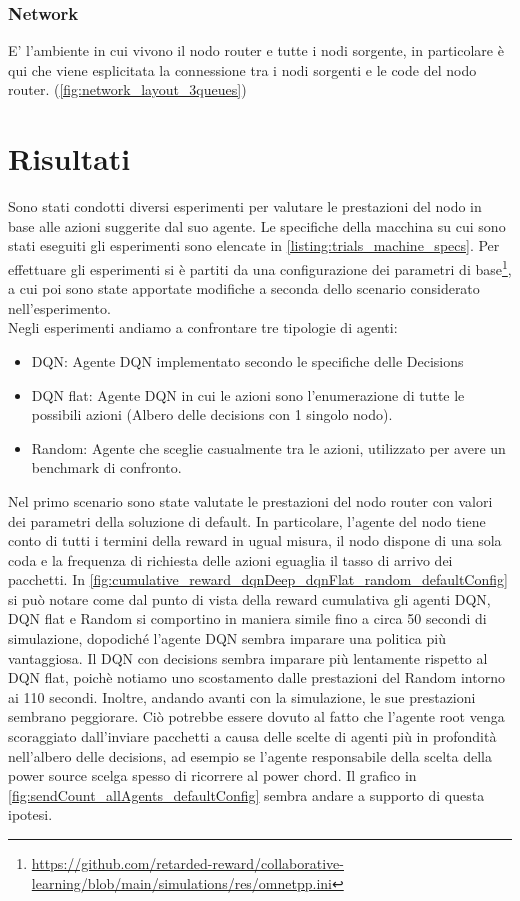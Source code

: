 \documentclass[conference]{IEEEtran}
\begin{document}
\subsubsection{Network}
E' l'ambiente in cui vivono il nodo router e tutte i nodi sorgente, in particolare è qui che viene esplicitata la connessione tra i nodi sorgenti e le code del nodo router. (\autoref{fig:network_layout_3queues}) 

\section{Risultati}
Sono stati condotti diversi esperimenti per valutare le prestazioni del nodo in base 
alle azioni suggerite dal suo agente. Le specifiche della macchina su cui sono stati
eseguiti gli esperimenti sono elencate in \autoref{listing:trials_machine_specs}.
Per effettuare gli esperimenti si è partiti da una configurazione dei parametri di 
base\footnote{\href{https://github.com/retarded-reward/collaborative-learning/blob/main/simulations/res/omnetpp.ini}{https://github.com/retarded-reward/collaborative-learning/blob/main/simulations/res/omnetpp.ini}}, a cui poi sono state apportate modifiche a seconda dello scenario considerato
nell'esperimento. \\
Negli esperimenti andiamo a confrontare tre tipologie di agenti:
\begin{itemize}
    \item DQN: Agente DQN implementato secondo le specifiche delle Decisions
    \item DQN flat: Agente DQN in cui le azioni sono l'enumerazione di tutte le possibili azioni (Albero delle decisions con 1 singolo nodo). 
    \item Random: Agente che sceglie casualmente tra le azioni, utilizzato per avere un benchmark di confronto.
\end{itemize}

Nel primo scenario sono state valutate le prestazioni del nodo router con valori dei
parametri della soluzione di default. In particolare, l'agente del nodo tiene conto
di tutti i termini della reward in ugual misura, il nodo dispone di una sola coda
e la frequenza di richiesta delle azioni eguaglia il tasso di arrivo dei pacchetti. 
In \autoref{fig:cumulative_reward_dqnDeep_dqnFlat_random_defaultConfig} si può notare
come dal punto di vista della reward cumulativa gli agenti DQN, DQN flat e
Random si comportino in maniera simile fino a circa 50 secondi di simulazione, dopodiché
l'agente DQN sembra imparare una politica più vantaggiosa. Il DQN con decisions sembra
imparare più lentamente rispetto al DQN flat, poichè notiamo uno scostamento dalle
prestazioni del Random intorno ai 110 secondi. Inoltre, andando avanti con la simulazione,
le sue prestazioni sembrano peggiorare. Ciò potrebbe essere dovuto al fatto che 
l'agente root venga scoraggiato dall'inviare pacchetti a causa delle scelte di agenti
più in profondità nell'albero delle decisions, ad esempio se l'agente responsabile della
scelta della power source scelga spesso di ricorrere al power chord. Il grafico in 
\autoref{fig:sendCount_allAgents_defaultConfig} sembra andare a supporto di questa
ipotesi.
\end{document}
